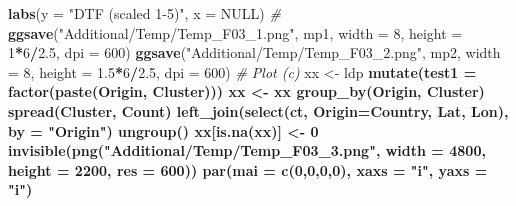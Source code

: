 \documentclass[
]{article}
\newenvironment{Shaded}{\begin{snugshade}}{\end{snugshade}}
\newcommand{\CommentTok}[1]{\textcolor[rgb]{0.56,0.35,0.01}{\textit{#1}}}
\newcommand{\DataTypeTok}[1]{\textcolor[rgb]{0.13,0.29,0.53}{#1}}
\newcommand{\DecValTok}[1]{\textcolor[rgb]{0.00,0.00,0.81}{#1}}
\newcommand{\FloatTok}[1]{\textcolor[rgb]{0.00,0.00,0.81}{#1}}
\newcommand{\KeywordTok}[1]{\textcolor[rgb]{0.13,0.29,0.53}{\textbf{#1}}}
\newcommand{\NormalTok}[1]{#1}
\newcommand{\OperatorTok}[1]{\textcolor[rgb]{0.81,0.36,0.00}{\textbf{#1}}}
\newcommand{\OtherTok}[1]{\textcolor[rgb]{0.56,0.35,0.01}{#1}}
\newcommand{\StringTok}[1]{\textcolor[rgb]{0.31,0.60,0.02}{#1}}
\begin{document}
\begin{Shaded}
\begin{Highlighting}[]
{{{{{{{{{{{{{{{{{{{{{{\StringTok{  }\KeywordTok{labs}\NormalTok{(}\DataTypeTok{y =} \StringTok{"DTF (scaled 1-5)"}\NormalTok{, }\DataTypeTok{x =} \OtherTok{NULL}\NormalTok{)}
\CommentTok{#}
\KeywordTok{ggsave}\NormalTok{(}\StringTok{"Additional/Temp/Temp_F03_1.png"}\NormalTok{, mp1, }\DataTypeTok{width =} \DecValTok{8}\NormalTok{, }\DataTypeTok{height =}   \DecValTok{1}\OperatorTok{*}\DecValTok{6}\OperatorTok{/}\FloatTok{2.5}\NormalTok{, }\DataTypeTok{dpi =} \DecValTok{600}\NormalTok{)}
\KeywordTok{ggsave}\NormalTok{(}\StringTok{"Additional/Temp/Temp_F03_2.png"}\NormalTok{, mp2, }\DataTypeTok{width =} \DecValTok{8}\NormalTok{, }\DataTypeTok{height =} \FloatTok{1.5}\OperatorTok{*}\DecValTok{6}\OperatorTok{/}\FloatTok{2.5}\NormalTok{, }\DataTypeTok{dpi =} \DecValTok{600}\NormalTok{)}
\CommentTok{# Plot (c)}
\NormalTok{xx <-}\StringTok{ }\NormalTok{ldp }\OperatorTok{%
\StringTok{  }\KeywordTok{mutate}\NormalTok{(}\DataTypeTok{test1 =} \KeywordTok{factor}\NormalTok{(}\KeywordTok{paste}\NormalTok{(Origin, Cluster)))}
\NormalTok{xx <-}\StringTok{ }\NormalTok{xx }\OperatorTok{%
\StringTok{  }\KeywordTok{group_by}\NormalTok{(Origin, Cluster) }\OperatorTok{%
\StringTok{  }\KeywordTok{spread}\NormalTok{(Cluster, Count) }\OperatorTok{%
\StringTok{  }\KeywordTok{left_join}\NormalTok{(}\KeywordTok{select}\NormalTok{(ct, }\DataTypeTok{Origin=}\NormalTok{Country, Lat, Lon), }\DataTypeTok{by =} \StringTok{"Origin"}\NormalTok{) }\OperatorTok{%
\StringTok{  }\KeywordTok{ungroup}\NormalTok{() }\OperatorTok{%
\NormalTok{xx[}\KeywordTok{is.na}\NormalTok{(xx)] <-}\StringTok{ }\DecValTok{0} 
\KeywordTok{invisible}\NormalTok{(}\KeywordTok{png}\NormalTok{(}\StringTok{"Additional/Temp/Temp_F03_3.png"}\NormalTok{, }\DataTypeTok{width =} \DecValTok{4800}\NormalTok{, }\DataTypeTok{height =} \DecValTok{2200}\NormalTok{, }\DataTypeTok{res =} \DecValTok{600}\NormalTok{))}
\KeywordTok{par}\NormalTok{(}\DataTypeTok{mai =} \KeywordTok{c}\NormalTok{(}\DecValTok{0}\NormalTok{,}\DecValTok{0}\NormalTok{,}\DecValTok{0}\NormalTok{,}\DecValTok{0}\NormalTok{), }\DataTypeTok{xaxs =} \StringTok{"i"}\NormalTok{, }\DataTypeTok{yaxs =} \StringTok{"i"}\NormalTok{)}
}}}}}}}}}}}}}}}}}}}}}}}}}}}}
\end{Highlighting}
\end{Shaded}
\end{document}
